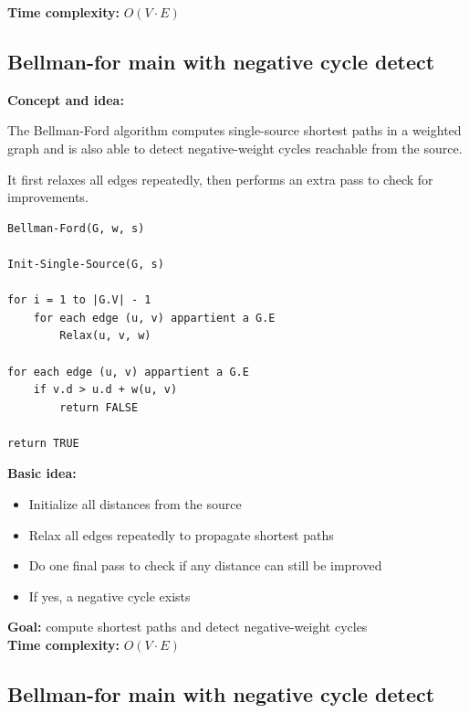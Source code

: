 \documentclass[11pt,a4paper,openany]{book}
\begin{document}
\textbf{Time complexity:} $O(V \cdot E)$





\vspace{2cm}





\subsection{Bellman-for main with negative cycle detect}

\textbf{Concept and idea:}

The Bellman-Ford algorithm computes single-source shortest paths in a weighted graph and is also able to detect negative-weight cycles reachable from the source.

It first relaxes all edges repeatedly, then performs an extra pass to check for improvements.

\begin{lstlisting}
Bellman-Ford(G, w, s)

Init-Single-Source(G, s)

for i = 1 to |G.V| - 1
    for each edge (u, v) appartient a G.E
        Relax(u, v, w)

for each edge (u, v) appartient a G.E
    if v.d > u.d + w(u, v)
        return FALSE

return TRUE
\end{lstlisting}

\textbf{Basic idea:}
\begin{itemize}
    \item Initialize all distances from the source
    \item Relax all edges repeatedly to propagate shortest paths
    \item Do one final pass to check if any distance can still be improved
    \item If yes, a negative cycle exists
\end{itemize}

\textbf{Goal:} compute shortest paths and detect negative-weight cycles \\

\textbf{Time complexity:} $O(V \cdot E)$



\vspace{2cm}





\subsection{Bellman-for main with negative cycle detect}
\end{document}
